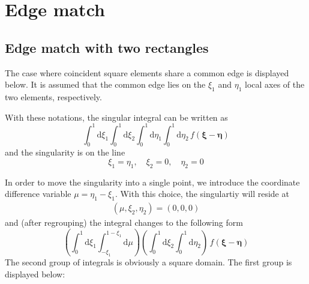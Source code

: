 \documentclass{article}
\newcommand{\td}{\mathrm{d}}
\begin{document}
\section{Edge match}

\subsection{Edge match with two rectangles}

The case where coincident square elements share a common edge is displayed  below. It is assumed that the common edge lies on the $\xi_1$ and $\eta_1$ local axes of the two elements, respectively.


With these notations, the singular integral can be written as
%
\begin{equation}
\int_{0}^{1} \td \xi_1
\int_{0}^{1} \td \xi_2
\int_{0}^{1} \td \eta_1
\int_{0}^{1} \td \eta_2
\, f(\bm{\xi}-\bm{\eta})
\end{equation}
%
and the singularity is on the line
%
\begin{equation}
\xi_1 = \eta_1, \quad
\xi_2 = 0, \quad
\eta_2 = 0
\end{equation}

In order to move the singularity into a single point, we introduce the coordinate difference variable $\mu = \eta_1-\xi_1$. With this choice, the singulartiy will reside at
%
\begin{align}
(\mu, \xi_2, \eta_2) = (0, 0, 0)
\end{align}
%
and (after regrouping) the integral changes to the following form
%
\begin{equation}
\left(
\int_{0}^{1} \td \xi_1
\int_{-\xi_1}^{1-\xi_1} \td \mu
\right)
\left(
\int_{0}^{1} \td \xi_2
\int_{0}^{1} \td \eta_2
\right)
\, f(\bm{\xi}-\bm{\eta})
\end{equation}
%
The second group of integrals is obviously a square domain. The first group is displayed below:
\end{document}

